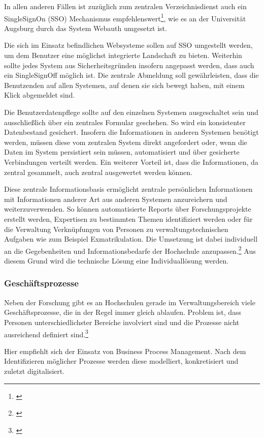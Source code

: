 In allen anderen Fällen ist zuzüglich zum zentralen Verzeichnisdienst auch ein SingleSignOn (SSO) Mechanismus empfehlenswert\footnote{\cite{zahn_itmanagement}}, wie es an der Universität Augsburg durch das System Webauth umgesetzt ist.

Die sich im Einsatz befindlichen Websysteme sollen auf SSO umgestellt werden, um dem Benutzer eine möglichst integrierte Landschaft zu bieten. Weiterhin sollte jedes System aus Sicherheitsgründen insofern angepasst werden, dass auch ein SingleSignOff möglich ist. Die zentrale Abmeldung soll gewährleisten, dass die Benutzenden auf allen Systemen, auf denen sie sich bewegt haben, mit einem Klick abgemeldet sind.

Die Benutzerdatenpflege sollte auf den einzelnen Systemen ausgeschaltet sein und ausschließlich über ein zentrales Formular geschehen. So wird ein konsistenter Datenbestand gesichert. Insofern die Informationen in anderen Systemen benötigt werden, müssen diese vom zentralen System direkt angefordert oder, wenn die Daten im System persistiert sein müssen, automatisiert und über gesicherte Verbindungen verteilt werden. Ein weiterer Vorteil ist, dass die Informationen, da zentral gesammelt, auch zentral ausgewertet werden können.

Diese zentrale Informationsbasis ermöglicht zentrale persönlichen Informationen mit Informationen anderer Art aus anderen Systemen anzureichern und weiterzuverwenden. So können automatisierte Reports über Forschungsprojekte erstellt werden, Expertisen zu bestimmten Themen identifiziert werden oder für die Verwaltung Verknüpfungen von Personen zu verwaltungstechnischen Aufgaben wie zum Beispiel Exmatrikulation. Die Umsetzung ist dabei individuell an die Gegebenheiten und Informationsbedarfe der Hochschule anzupassen.\footnote{\cite{vogl_fortschritte_2012}} Aus diesem Grund wird die technische Lösung eine Individuallösung werden.

\subsubsection{Geschäftsprozesse}
Neben der Forschung gibt es an Hochschulen gerade im Verwaltungsbereich viele Geschäftsprozesse, die in der Regel immer gleich ablaufen. Problem ist, dass Personen unterschiedlichster Bereiche involviert sind und die Prozesse nicht ausreichend definiert sind.\footnote{\cite{becker_prozesse_2010}}

Hier empfiehlt sich der Einsatz von Business Process Management. Nach dem Identifizieren möglicher Prozesse werden diese modelliert, konkretisiert und zuletzt digitalisiert.


